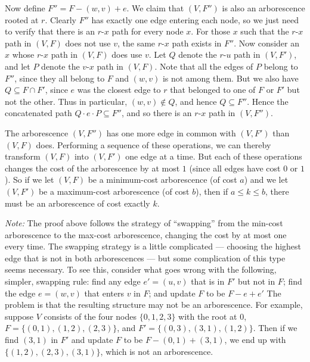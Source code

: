 \documentclass[12pt]{article}
\begin{document}
\begin{enumerate}
{Now define $F'' = F - (w,v) + e$.
We claim that $(V,F'')$ is also an arborescence rooted at $r$.
Clearly $F''$ has exactly one edge entering each node,
so we just need to verify that there is an $r$-$x$
path for every node $x$.
For those $x$ such that the $r$-$x$ path in $(V,F)$ does not
use $v$, the same $r$-$x$ path exists in $F''$.
Now consider an $x$ whose $r$-$x$ path in $(V,F)$ does use $v$.
Let $Q$ denote the $r$-$u$ path in $(V,F')$,
and let $P$ denote the $v$-$x$ path in $(V,F)$.
Note that all the edges of $P$ belong to $F''$, since
they all belong to $F$ and $(w,v)$ is not among them.
But we also have $Q \subseteq F \cap F'$, since
$e$ was the closest edge to $r$ that belonged to one
of $F$ or $F'$ but not the other.
Thus in particular, $(w,v) \not\in Q$, and hence $Q \subseteq F''$.
Hence the concatenated path $Q \cdot e \cdot P \subseteq F''$,
and so there is an $r$-$x$ path in $(V,F'')$.

The arborescence $(V,F'')$ has one more edge in common
with $(V,F')$ than $(V,F)$ does.
Performing a sequence of these operations,
we can thereby transform $(V,F)$ into $(V,F')$ one edge at a time.
But each of these operations changes the cost of the
arborescence by at most $1$ (since all edges have cost $0$ or $1$).
So if we let $(V,F)$ be a minimum-cost arborescence (of cost $a$)
and we let $(V,F')$ be a maximum-cost arborescence (of cost $b$),
then if $a \leq k \leq b$, there must be an
arborescence of cost exactly $k$.

\medskip
{\em Note:} The proof above follows the strategy of
``swapping'' from the min-cost arborescence to
the max-cost arborescence, changing the cost by at most
one every time.
The swapping strategy is a little complicated --- choosing
the highest edge that is not in both arborescences ---
but some complication of this type seems necessary.
To see this, consider what goes wrong with the following,
simpler, swapping rule:
find any edge $e' = (u,v)$ that is in $F'$ but not in $F$;
find the edge $e = (w,v)$ that enters $v$ in $F$;
and update $F$ to be $F - e + e'$
The problem is that the resulting structure may not
be an arborescence.
For example, suppose $V$ consists of the four nodes $\{0, 1, 2, 3\}$
with the root at $0$,
$F = \{(0,1), (1,2), (2,3)\}$,
and $F' = \{(0,3), (3,1), (1,2)\}$.
Then if we find $(3,1)$ in $F'$ and update $F$ to be $F - (0,1) + (3,1)$,
we end up with $\{(1,2), (2,3), (3,1)\}$, which is not an arborescence.

}





\end{enumerate}
\end{document}
